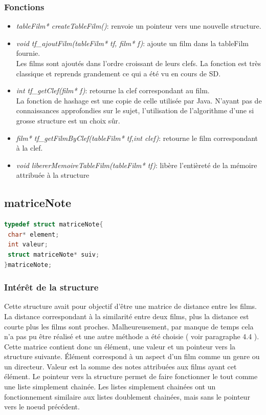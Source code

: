 \documentclass{article}
\begin{document}
\subsubsection{Fonctions}
    \begin{itemize}
        \item \textit{tableFilm* createTableFilm()}: renvoie un pointeur vers une nouvelle structure.
        \item \textit{void tf\_ajoutFilm(tableFilm* tf, film* f)}: ajoute un film dans la tableFilm fournie.\\
    Les films sont ajoutés dans l'ordre croissant de leurs clefs. La fonction est très classique et reprends grandement ce qui a été vu en cours de SD.
        \item \textit{int tf\_getClef(film* f)}: retourne la clef correspondant au film.\\
    La fonction de hashage est une copie de celle utilisée par Java\cite{hashJava}. N'ayant pas de connaissances approfondies sur le sujet, l'utilisation de l'algorithme d'une si grosse structure est un choix sûr.
        \item \textit{film* tf\_getFilmByClef(tableFilm* tf,int clef)}: retourne le film correspondant à la clef.
        \item \textit{void libererMemoireTableFilm(tableFilm* tf)}: libère l'entièreté de la mémoire attribuée à la structure
    \end{itemize}
\medbreak
\subsection{matriceNote}
    \begin{lstlisting}[language=C]
typedef struct matriceNote{
 char* element;
 int valeur;
 struct matriceNote* suiv;
}matriceNote;
\end{lstlisting}

\subsubsection{Intérêt de la structure}
    Cette structure avait pour objectif d'être une matrice de distance entre les films. La distance correspondant à la similarité entre deux films, plus la distance est courte plus les films sont proches. Malheureusement, par manque de temps cela n'a pas pu être réalisé et une autre méthode a été choisie ( voir paragraphe 4.4 ). Cette matrice contient donc un élément, une valeur et un pointeur vers la structure suivante. Élément correspond à un aspect d'un film comme un genre ou un directeur. Valeur est la somme des notes attribuées aux films ayant cet élément. Le pointeur vers la structure permet de faire fonctionner le tout comme une liste simplement chainée. Les listes simplement chainées ont un fonctionnement similaire aux listes doublement chainées, mais sans le pointeur vers le noeud précédent.
    
\end{document}
